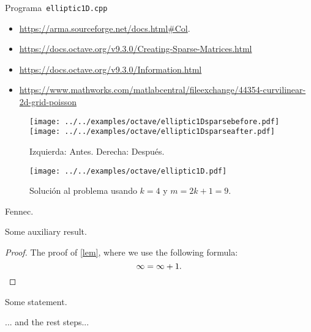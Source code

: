 \begin{problem}
\begin{listing}[ht!]
    \tiny
    \centering
    \inputminted[frame=single,framesep=10pt,linenos,firstline=1,lastline=52,highlightlines={18}]{cpp}{../../examples/cpp/elliptic1D.cpp}
    \caption{Programa~\texttt{elliptic1D.cpp}}
\end{listing}

\begin{itemize}
    \item

          \url{https://arma.sourceforge.net/docs.html#Col}.

    \item

          \url{https://docs.octave.org/v9.3.0/Creating-Sparse-Matrices.html}

    \item

          \url{https://docs.octave.org/v9.3.0/Information.html}

    \item

          \url{https://www.mathworks.com/matlabcentral/fileexchange/44354-curvilinear-2d-grid-poisson}
\end{itemize}

\begin{figure}[ht!]
    \centering
    \texttt{[image: ../../examples/octave/elliptic1Dsparsebefore.pdf]}
    \texttt{[image: ../../examples/octave/elliptic1Dsparseafter.pdf]}
    \caption{Izquierda: Antes. Derecha: Después.}
\end{figure}

\begin{figure}[ht!]
    \centering
    \texttt{[image: ../../examples/octave/elliptic1D.pdf]}
    \caption{Solución al problema usando $k=4$ y $m=2k+1=9$.}
\end{figure}

\noQED %
\end{problem}

\begin{problem}
Fennec.
\end{problem}

\begin{solution}
    \begin{lemma}\label{lem}
        Some auxiliary result.
    \end{lemma}
    \begin{proof}
        The proof of \cref{lem}, where we use the following formula:
        \[
            \infty = \infty + 1.
            \qedhere %
        \]
    \end{proof}
    \begin{fact}
        \proofless %
        Some statement.
    \end{fact}
    ... and the rest steps...
\end{solution}
